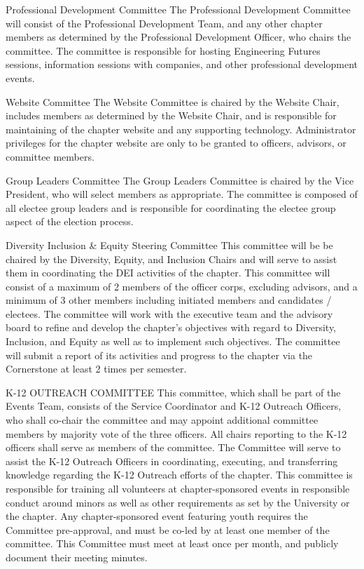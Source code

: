 \begin{enumsubsection}
	\item{Professional Development Committee} The Professional Development Committee will consist of the Professional Development Team, and any other chapter members as determined by the Professional Development Officer, who chairs the committee. The committee is responsible for hosting Engineering Futures sessions, information sessions with companies, and other professional development events.
	\item{Website Committee} \label{com-website} The Website Committee is chaired by the Website Chair, includes members as determined by the Website Chair, and is responsible for maintaining of the chapter website and any supporting technology. Administrator privileges for the chapter website are only to be granted to officers, advisors, or committee members.
	\item{Group Leaders Committee} The Group Leaders Committee is chaired by the Vice President, who will select members as appropriate. The committee is composed of all electee group leaders and is responsible for coordinating the electee group aspect of the election process.
  \item{Diversity Inclusion \& Equity Steering Committee} This committee will be be chaired by the Diversity, Equity, and Inclusion Chairs and will serve to assist them in coordinating the DEI activities of the chapter. This committee will consist of a maximum of 2 members of the officer corps, excluding advisors, and a minimum of 3 other members including initiated members and candidates / electees. The committee will work with the executive team and the advisory board to refine and develop the chapter's objectives with regard to Diversity, Inclusion, and Equity as well as to implement such objectives. The committee will submit a report of its activities and progress to the chapter via the Cornerstone at least 2 times per semester.
  \item{K-12 OUTREACH COMMITTEE} This committee, which shall be part of the Events Team, consists of the Service Coordinator and K-12 Outreach Officers, who shall co-chair the committee and may appoint additional committee members by majority vote of the three officers.  All chairs reporting to the K-12 officers shall serve as members of the committee.  The Committee will serve to assist the K-12 Outreach Officers in coordinating, executing, and transferring knowledge regarding the K-12 Outreach efforts of the chapter. This committee is responsible for training all volunteers at chapter-sponsored events in responsible conduct around minors as well as other requirements as set by the University or the chapter. Any chapter-sponsored event featuring youth requires the Committee pre-approval, and must be co-led by at least one member of the committee. This Committee must meet at least once per month, and publicly document their meeting minutes.
\end{enumsubsection}

